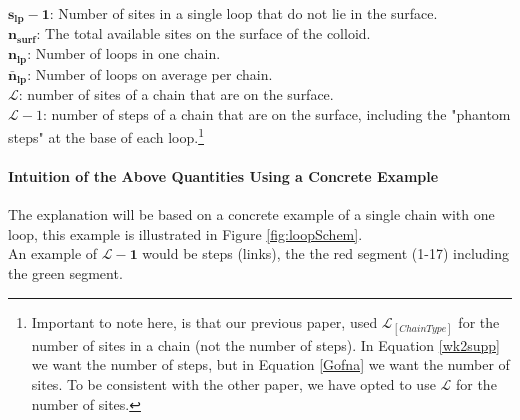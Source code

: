 \documentclass[12pt,letterpaper]{article}
\newcommand{\leng}{\mathcal{L}}
\begin{document}
$
\boldsymbol{
    s_{lp}
    -
    1
}
$: 
Number of sites in a single loop that do not lie in the surface.\\





$
\boldsymbol{
    n_{surf}
}
$: 
The total available sites on the surface of the colloid.\\

$
\boldsymbol{
n_{lp}
}
$: 
Number of loops in one chain.\\

$
\boldsymbol{
    \bar{n}_{lp}
}
$: 
Number of loops on average per chain.\\

$\leng$: number of sites of a chain that are on the surface.\\

$\leng-1$: number of steps of a chain that are on the surface, including the "phantom steps" at the base of each loop.\footnote{Important to note here, is that our previous paper, used $\leng_{[ChainType]}$ for the number of sites in a chain (not the number of steps).  In Equation \ref{wk2supp} we want the number of steps, but in Equation \ref{Gofna} we want the number of sites. To be consistent with the other paper, we have opted to use $\leng$ for the number of sites.}\\


\paragraph{Intuition of the Above Quantities Using a Concrete Example} The explanation will be based on a concrete example of a single chain with one loop, this example is illustrated in Figure \ref{fig:loopSchem}.\\

An example of $\boldsymbol{\leng-1}$ would be steps (links), the the red segment (1-17) including the green segment.\\
\end{document}
